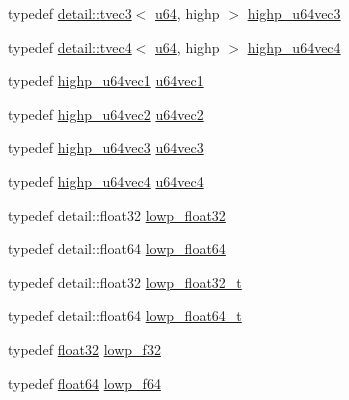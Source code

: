 \begin{DoxyCompactItemize}
\item 
typedef \hyperlink{structglm_1_1detail_1_1tvec3}{detail\+::tvec3}$<$ \hyperlink{group__gtc__type__precision_ga71cedd4972f9cb1a5e14dfe5ab83ecd7}{u64}, highp $>$ \hyperlink{group__gtc__type__precision_ga3cb5c038f8cba0dfb894af66b7b2ba13}{highp\+\_\+u64vec3}
\item 
typedef \hyperlink{structglm_1_1detail_1_1tvec4}{detail\+::tvec4}$<$ \hyperlink{group__gtc__type__precision_ga71cedd4972f9cb1a5e14dfe5ab83ecd7}{u64}, highp $>$ \hyperlink{group__gtc__type__precision_ga8aa6fc9f16dfa3078d411f6361188a45}{highp\+\_\+u64vec4}
\item 
typedef \hyperlink{group__gtc__type__precision_gab48ca217e1d1cc9aac3d9f037493ae7e}{highp\+\_\+u64vec1} \hyperlink{group__gtc__type__precision_ga7d5145019ad749f4becd39ce8e786a5f}{u64vec1}
\item 
typedef \hyperlink{group__gtc__type__precision_gad11667a4764867732a89791ec2a01aeb}{highp\+\_\+u64vec2} \hyperlink{group__gtc__type__precision_gaffa78d655fd98b33e47043e2bd38641b}{u64vec2}
\item 
typedef \hyperlink{group__gtc__type__precision_ga3cb5c038f8cba0dfb894af66b7b2ba13}{highp\+\_\+u64vec3} \hyperlink{group__gtc__type__precision_gae934e74663d832989066cc852560866d}{u64vec3}
\item 
typedef \hyperlink{group__gtc__type__precision_ga8aa6fc9f16dfa3078d411f6361188a45}{highp\+\_\+u64vec4} \hyperlink{group__gtc__type__precision_ga59d78a1ff6d275bbb425dce92f607b9c}{u64vec4}
\item 
typedef detail\+::float32 \hyperlink{group__gtc__type__precision_ga92be8087f3c84504f3a44af1a9efc51e}{lowp\+\_\+float32}
\item 
typedef detail\+::float64 \hyperlink{group__gtc__type__precision_ga32e02689f4e83fb269c9047418536f2c}{lowp\+\_\+float64}
\item 
typedef detail\+::float32 \hyperlink{group__gtc__type__precision_gadfb453b23cb820e3e4e766e047c67dab}{lowp\+\_\+float32\+\_\+t}
\item 
typedef detail\+::float64 \hyperlink{group__gtc__type__precision_gac9d64f4e69d6c2eade41a848077866b5}{lowp\+\_\+float64\+\_\+t}
\item 
typedef \hyperlink{group__gtc__type__precision_ga814f2f65354b6588b067cc5c67a6b340}{float32} \hyperlink{group__gtc__type__precision_ga1b9734de4b4429dc26b1454a2a399b05}{lowp\+\_\+f32}
\item 
typedef \hyperlink{group__gtc__type__precision_gab721f828b41f46b20cf4883b50733d3b}{float64} \hyperlink{group__gtc__type__precision_ga59839f4bf6b97c93b0def577890bbfb8}{lowp\+\_\+f64}

\end{DoxyCompactItemize}
